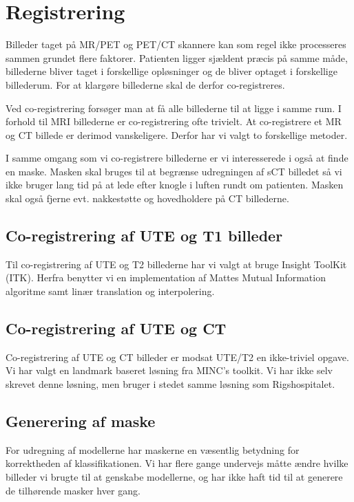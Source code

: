 \section{Registrering}

Billeder taget på MR/PET og PET/CT skannere kan som regel ikke
processeres sammen grundet flere faktorer. Patienten ligger sjældent
præcis på samme måde, billederne bliver taget i forskellige
opløsninger og de bliver optaget i forskellige billederum. For at
klargøre billederne skal de derfor co-registreres.

Ved co-registrering forsøger man at få alle billederne til at ligge i
samme rum. I forhold til MRI billederne er co-registrering ofte trivielt.
At co-registrere et MR og CT billede er derimod vanskeligere. Derfor har
vi valgt to forskellige metoder.

I samme omgang som vi co-registrere billederne er vi interesserede i
også at finde en maske. Masken skal bruges til at begrænse udregningen
af sCT billedet så vi ikke bruger lang tid på at lede efter knogle i
luften rundt om patienten. Masken skal også fjerne evt. nakkestøtte og
hovedholdere på CT billederne.

\subsection{Co-registrering af UTE og T1 billeder}

Til co-registrering af UTE og T2 billederne har vi valgt at bruge
Insight ToolKit (ITK). Herfra benytter vi en implementation af Mattes
Mutual Information algoritme samt linær translation og interpolering.

\subsection{Co-registrering af UTE og CT}

Co-registrering af UTE og CT billeder er modsat UTE/T2 en ikke-triviel
opgave. Vi har valgt en landmark baseret løsning fra MINC's toolkit.
Vi har ikke selv skrevet denne løsning, men bruger i stedet samme
løsning som Rigshospitalet.

\subsection{Generering af maske}

For udregning af modellerne har maskerne en væsentlig betydning for korrektheden af klassifikationen. Vi har flere gange undervejs måtte ændre hvilke billeder vi brugte til at genskabe modellerne, og har ikke haft tid til at generere de tilhørende masker hver gang.

